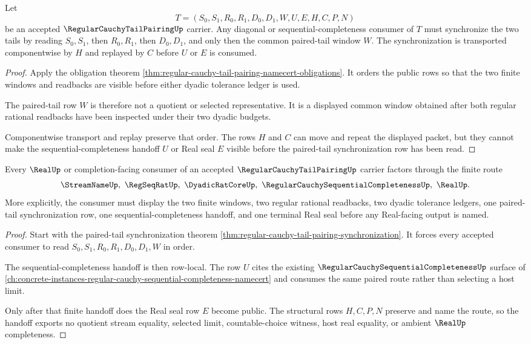 \begin{theorem}
\label{thm:regular-cauchy-tail-pairing-synchronization}
Let
$$
T=(S_0,S_1,R_0,R_1,D_0,D_1,W,U,E,H,C,P,N)
$$
be an accepted $\RegularCauchyTailPairingUp$ carrier. Any diagonal or sequential-completeness consumer of $T$ must synchronize the two tails by reading $S_0,S_1$, then $R_0,R_1$, then $D_0,D_1$, and only then the common paired-tail window $W$. The synchronization is transported componentwise by $H$ and replayed by $C$ before $U$ or $E$ is consumed.
\end{theorem}
\begin{proof}
Apply the obligation theorem \autoref{thm:regular-cauchy-tail-pairing-namecert-obligations}. It orders the public rows so that the two finite windows and readbacks are visible before either dyadic tolerance ledger is used.

The paired-tail row $W$ is therefore not a quotient or selected representative. It is a displayed common window obtained after both regular rational readbacks have been inspected under their two dyadic budgets.

Componentwise transport and replay preserve that order. The rows $H$ and $C$ can move and repeat the displayed packet, but they cannot make the sequential-completeness handoff $U$ or Real seal $E$ visible before the paired-tail synchronization row has been read.
\end{proof}

\begin{theorem}
\label{thm:regular-cauchy-tail-pairing-realup-seal-handoff}
Every $\RealUp$ or completion-facing consumer of an accepted $\RegularCauchyTailPairingUp$ carrier factors through the finite route
$$
\StreamNameUp,\ \RegSeqRatUp,\ \DyadicRatCoreUp,\ \RegularCauchySequentialCompletenessUp,\ \RealUp .
$$
More explicitly, the consumer must display the two finite windows, two regular rational readbacks, two dyadic tolerance ledgers, one paired-tail synchronization row, one sequential-completeness handoff, and one terminal Real seal before any Real-facing output is named.
\end{theorem}
\begin{proof}
Start with the paired-tail synchronization theorem \autoref{thm:regular-cauchy-tail-pairing-synchronization}. It forces every accepted consumer to read $S_0,S_1,R_0,R_1,D_0,D_1,W$ in order.

The sequential-completeness handoff is then row-local. The row $U$ cites the existing $\RegularCauchySequentialCompletenessUp$ surface of \autoref{ch:concrete-instances-regular-cauchy-sequential-completeness-namecert} and consumes the same paired route rather than selecting a host limit.

Only after that finite handoff does the Real seal row $E$ become public. The structural rows $H,C,P,N$ preserve and name the route, so the handoff exports no quotient stream equality, selected limit, countable-choice witness, host real equality, or ambient $\RealUp$ completeness.
\end{proof}

